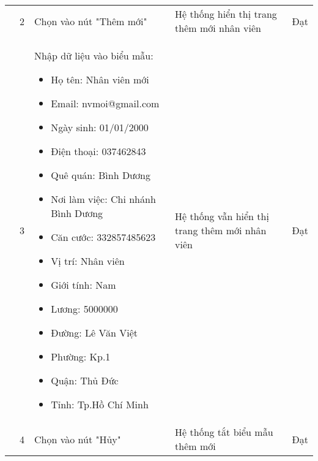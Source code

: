 {\begin{longtable}{| p{2.5cm}| p{1cm}| p{5.5cm}| p{4.5cm} | p{1.5cm} |}
        \cline{2-5}
         & 2 & Chọn vào nút "Thêm mới" & Hệ thống hiển thị trang thêm mới nhân viên & Đạt \\
        \cline{2-5}
        & 3 & Nhập dữ liệu vào biểu mẫu:
        \begin{itemize}
            \item Họ tên: Nhân viên mới
            \item Email: nvmoi@gmail.com
            \item Ngày sinh: 01/01/2000
            \item Điện thoại: 037462843
            \item Quê quán: Bình Dương
            \item Nơi làm việc: Chi nhánh Bình Dương
            \item Căn cước: 332857485623
            \item Vị trí: Nhân viên
            \item Giới tính: Nam
            \item Lương: 5000000
            \item Đường: Lê Văn Việt
            \item Phường: Kp.1
            \item Quận: Thủ Đức 
            \item Tỉnh: Tp.Hồ Chí Minh
        \end{itemize} & Hệ thống vẫn hiển thị trang thêm mới nhân viên & Đạt \\
        \cline{2-5}
         & 4 & Chọn vào nút "Hủy" & Hệ thống tắt biểu mẫu thêm mới & Đạt \\
        \hline
    \end{longtable} 
}


